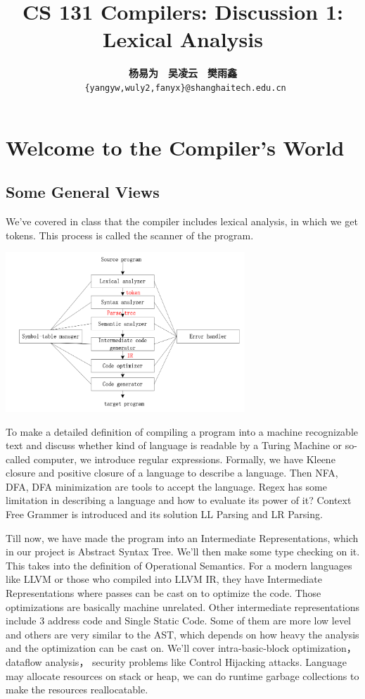 \documentclass[a4paper]{exam}
\title{CS 131 Compilers: Discussion 1: Lexical Analysis}
\author{\textbf{杨易为}~~\textbf{吴凌云}~~\textbf{樊雨鑫} \\ \texttt{ \{yangyw,wuly2,fanyx\}@shanghaitech.edu.cn}}
\begin{document}
\maketitle
\section{Welcome to the Compiler's World}
\subsection{Some General Views}

We've covered in class that the compiler includes lexical analysis, in which we get tokens. This process is called the scanner of the program.
\begin{center}
  \includegraphics[height=6cm]{img/01-phases.png}
\end{center}

To make a detailed definition of compiling a program into a machine recognizable text and discuss whether kind of language is readable by a Turing Machine or so-called computer, we introduce regular expressions. Formally, we have Kleene closure and positive closure of a language to describe a language. Then NFA, DFA, DFA minimization are tools to accept the language. Regex has some limitation in describing a language and how to evaluate its power of it? Context Free Grammer is introduced and its solution LL Parsing and LR Parsing.

Till now, we have made the program into an Intermediate Representations, which in our project is Abstract Syntax Tree. We'll then make some type checking on it. This takes into the definition of Operational Semantics. For a modern languages like LLVM or those who compiled into LLVM IR, they have Intermediate Representations where passes can be cast on to optimize the code. Those optimizations are basically machine unrelated. Other intermediate representations include 3 address code and Single Static Code. Some of them are more low level and others are very similar to the AST, which depends on how heavy the analysis and the optimization can be cast on. We'll cover intra-basic-block optimization， dataflow analysis， security problems like Control Hijacking attacks. Language may allocate resources on stack or heap, we can do runtime garbage collections to make the resources reallocatable.
\end{document}

